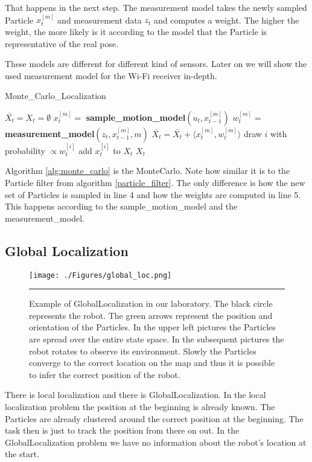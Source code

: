 That happens in the next step. The measurement model takes the newly sampled \gls{Particle} $x_t^{[m]}$ and measurement data $z_t$ and computes a weight. The higher the weight, the more likely is it according to the model that the \gls{Particle} is representative of the real pose. 

These models are different for different kind of sensors. Later on we will show the used measurement model for the Wi-Fi receiver in-depth. 

\begin{algorithm}
\caption{Monte\_Carlo\_Localization \cite[p. 252]{Thrun:2005:PR:1121596}}
\label{alg:monte_carlo}
\begin{algorithmic}[1]
\State $\bar{X_t} = X_t = \emptyset$
\State $x_t^{[m]} = $ \textbf{sample\_motion\_model}$(u_t,x_{t-1}^{[m]})$
\State $w_t^{[m]} = $ \textbf{measurement\_model}$(z_t,x_{t-1}^{[m]},m)$
\State $\bar{X_t} = \bar{X_t} + \langle x_t^{[m]},w_t^{[m]}\rangle$
\EndFor
{}
\State draw $i$ with probability $\propto w_t^{[i]}$
\State add $x_t^{[i]}$ to $X_t$
\EndFor
\State \Return $X_t$
\EndProcedure
\end{algorithmic}
\end{algorithm}

Algorithm \ref{alg:monte_carlo} is the \Gls{MonteCarlo}. Note how similar it is to the \gls{Particle} filter from algorithm \ref{particle_filter}. The only difference is how the new set of \gls{Particle}s is sampled in line 4 and how the weights are computed in line 5. This happens according to the sample\_motion\_model and the measurement\_model. 
\subsection{Global Localization}
\begin{figure}[htbp]
	\centering
		\texttt{[image: ./Figures/global\_loc.png]}
		\rule{35em}{0.5pt}
	\caption[Example of the \gls{GlobalLocalization}]{Example of \gls{GlobalLocalization} in our laboratory. The black circle represents the robot. The green arrows represent the position and orientation of the \gls{Particle}s. In the upper left pictures the \gls{Particle}s are spread over the entire state space. In the subsequent pictures the robot rotates to observe its environment. Slowly the \gls{Particle}s converge to the correct location on the map and thus it is possible to infer the correct position of the robot.}
	\label{fig:global_localization}
\end{figure}
There is local localization and there is \gls{GlobalLocalization}. In the local localization problem the position at the beginning is already known. The \gls{Particle}s are already clustered around the correct position at the beginning. The task then is just to track the position from there on out. In the \gls{GlobalLocalization} problem we have no information about the robot's location at the start.

